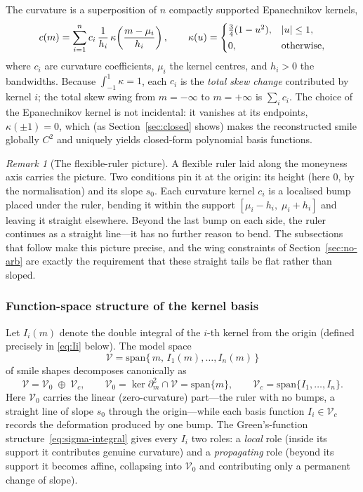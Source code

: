 \documentclass[11pt]{book}
\theoremstyle{plain}
\theoremstyle{definition}
\theoremstyle{remark}
\newtheorem{remark}[theorem]{Remark}
\newcommand{\mln}{m}                             %
\DeclarePairedDelimiter{\abs}{\lvert}{\rvert}
\begin{document}
The curvature is a superposition of $n$ compactly supported
Epanechnikov kernels,
\begin{equation}\label{eq:curvature-kernel}
c(\mln) = \sum_{i=1}^n c_i \,\frac{1}{h_i}\,
\kappa\!\left(\frac{\mln - \mu_i}{h_i}\right),
\qquad
\kappa(u) = \begin{cases}
\tfrac{3}{4}(1-u^2), & \abs{u}\le 1,\\[2pt]
0, & \text{otherwise},
\end{cases}
\end{equation}
where $c_i$ are curvature coefficients, $\mu_i$ the kernel centres, and
$h_i>0$ the bandwidths. Because $\int_{-1}^{1}\kappa = 1$, each $c_i$ is the
\emph{total skew change} contributed by kernel $i$; the total skew swing from
$\mln = -\infty$ to $\mln = +\infty$ is $\sum_i c_i$. The choice of the
Epanechnikov kernel is not incidental: it vanishes at its endpoints,
$\kappa(\pm 1) = 0$, which (as Section~\ref{sec:closed} shows) makes the
reconstructed smile globally $C^2$ and uniquely yields closed-form polynomial
basis functions.

\begin{remark}[The flexible-ruler picture]\label{rem:ruler}
A flexible ruler laid along the moneyness axis carries the picture. Two
conditions pin it at the origin: its height (here $0$, by the normalisation)
and its slope $s_0$.
Each curvature kernel $c_i$ is a localised bump placed under the ruler, bending
it within the support $[\mu_i - h_i,\;\mu_i + h_i]$ and leaving it straight
elsewhere. Beyond the last bump on each side, the ruler continues as a straight
line---it has no further reason to bend. The subsections that follow make this
picture precise, and the wing constraints of
Section~\ref{sec:no-arb} are exactly the requirement that these straight tails
be flat rather than sloped.
\end{remark}

\subsubsection*{Function-space structure of the kernel basis}

Let $I_i(\mln)$ denote the double integral of the $i$-th kernel from the origin
(defined precisely in \eqref{eq:Ii} below). The model space
\[
\mathcal{V} = \mathrm{span}\{\,\mln,\,I_1(\mln),\ldots,I_n(\mln)\,\}
\]
of smile shapes decomposes canonically as
\[
\mathcal{V} = \mathcal{V}_0 \;\oplus\; \mathcal{V}_c,
\qquad
\mathcal{V}_0 = \ker \partial_\mln^2 \cap \mathcal{V} = \mathrm{span}\{\mln\},
\qquad
\mathcal{V}_c = \mathrm{span}\{I_1,\ldots,I_n\}.
\]
Here $\mathcal{V}_0$ carries the linear (zero-curvature) part---the ruler with
no bumps, a straight line of slope $s_0$ through the origin---while each basis
function $I_i \in \mathcal{V}_c$ records the deformation produced by one bump.
The Green's-function structure~\eqref{eq:sigma-integral} gives every $I_i$ two
roles: a \emph{local} role (inside its support it contributes genuine
curvature) and a \emph{propagating} role (beyond its support it becomes affine,
collapsing into $\mathcal{V}_0$ and contributing only a permanent change of
slope).
\end{document}

